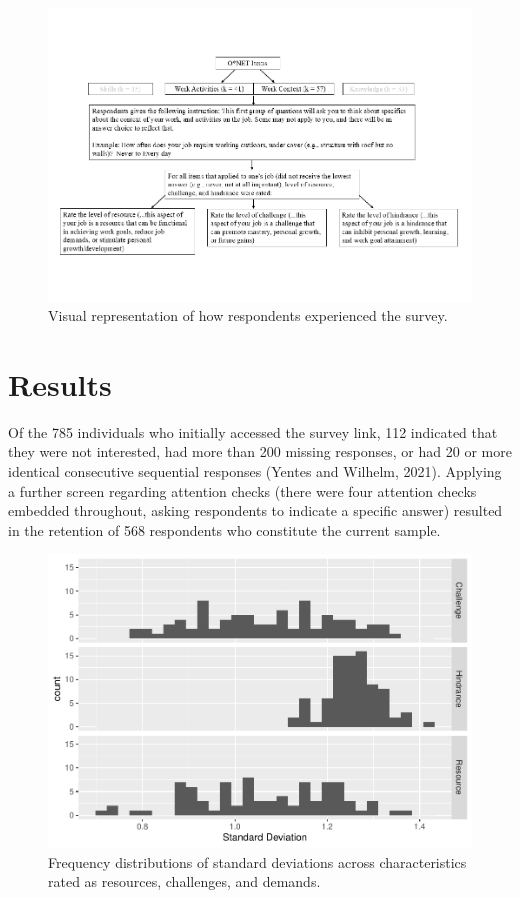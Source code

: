\documentclass[
  man]{apa7}
\begin{document}
\begin{figure}
\centering
\includegraphics{Submission_files/figure-latex/onetviz-1.pdf}
\caption{\label{fig:onetviz}Visual representation of how respondents experienced the survey.}
\end{figure}

\section{Results}\label{results}

Of the 785 individuals who initially accessed the survey link, 112 indicated that they were not interested, had more than 200 missing responses, or had 20 or more identical consecutive sequential responses (Yentes and Wilhelm, 2021). Applying a further screen regarding attention checks (there were four attention checks embedded throughout, asking respondents to indicate a specific answer) resulted in the retention of 568 respondents who constitute the current sample.

\begin{figure}
\centering
\includegraphics{Submission_files/figure-latex/overallhist-1.pdf}
\caption{\label{fig:overallhist}Frequency distributions of standard deviations across characteristics rated as resources, challenges, and demands.}
\end{figure}
\end{document}
